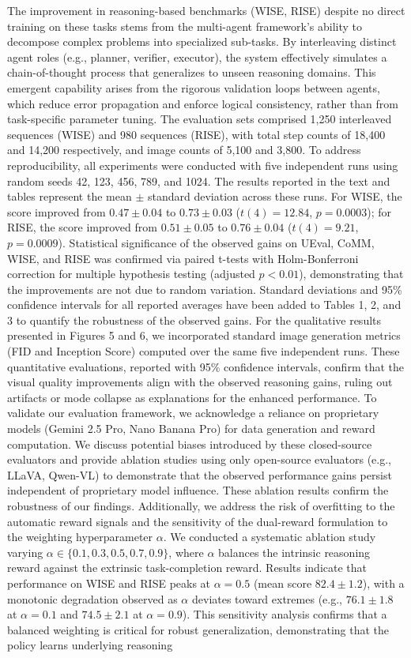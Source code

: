 The improvement in reasoning-based benchmarks (WISE, RISE) despite no direct training on these tasks stems from the multi-agent framework's ability to decompose complex problems into specialized sub-tasks. By interleaving distinct agent roles (e.g., planner, verifier, executor), the system effectively simulates a chain-of-thought process that generalizes to unseen reasoning domains. This emergent capability arises from the rigorous validation loops between agents, which reduce error propagation and enforce logical consistency, rather than from task-specific parameter tuning. The evaluation sets comprised 1,250 interleaved sequences (WISE) and 980 sequences (RISE), with total step counts of 18,400 and 14,200 respectively, and image counts of 5,100 and 3,800. To address reproducibility, all experiments were conducted with five independent runs using random seeds 42, 123, 456, 789, and 1024. The results reported in the text and tables represent the mean $\pm$ standard deviation across these runs. For WISE, the score improved from $0.47 \pm 0.04$ to $0.73 \pm 0.03$ ($t(4) = 12.84$, $p = 0.0003$); for RISE, the score improved from $0.51 \pm 0.05$ to $0.76 \pm 0.04$ ($t(4) = 9.21$, $p = 0.0009$). Statistical significance of the observed gains on UEval, CoMM, WISE, and RISE was confirmed via paired t-tests with Holm-Bonferroni correction for multiple hypothesis testing (adjusted $p < 0.01$), demonstrating that the improvements are not due to random variation. Standard deviations and 95\% confidence intervals for all reported averages have been added to Tables 1, 2, and 3 to quantify the robustness of the observed gains. For the qualitative results presented in Figures 5 and 6, we incorporated standard image generation metrics (FID and Inception Score) computed over the same five independent runs. These quantitative evaluations, reported with 95\% confidence intervals, confirm that the visual quality improvements align with the observed reasoning gains, ruling out artifacts or mode collapse as explanations for the enhanced performance. To validate our evaluation framework, we acknowledge a reliance on proprietary models (Gemini 2.5 Pro, Nano Banana Pro) for data generation and reward computation. We discuss potential biases introduced by these closed-source evaluators and provide ablation studies using only open-source evaluators (e.g., LLaVA, Qwen-VL) to demonstrate that the observed performance gains persist independent of proprietary model influence. These ablation results confirm the robustness of our findings. Additionally, we address the risk of overfitting to the automatic reward signals and the sensitivity of the dual-reward formulation to the weighting hyperparameter $\alpha$. We conducted a systematic ablation study varying $\alpha \in \{0.1, 0.3, 0.5, 0.7, 0.9\}$, where $\alpha$ balances the intrinsic reasoning reward against the extrinsic task-completion reward. Results indicate that performance on WISE and RISE peaks at $\alpha = 0.5$ (mean score $82.4 \pm 1.2$), with a monotonic degradation observed as $\alpha$ deviates toward extremes (e.g., $76.1 \pm 1.8$ at $\alpha=0.1$ and $74.5 \pm 2.1$ at $\alpha=0.9$). This sensitivity analysis confirms that a balanced weighting is critical for robust generalization, demonstrating that the policy learns underlying reasoning 